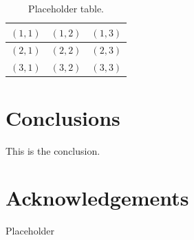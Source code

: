 \documentclass[12pt,a4paper,openright,twoside]{report}
\begin{document}
  \begin{table}[h]                        
    \begin{center}                          
      \begin{tabular}{r|c|c}                  
        \hline \hline                           
        $(1,1)$ & $(1,2)$ & $(1,3)$\\           
        \hline                                  
        $(2,1)$ & $(2,2)$ & $(2,3)$\\           
        \hline                                  
        $(3,1)$ & $(3,2)$ & $(3,3)$\\
        \hline \hline                           
      \end{tabular}
      \caption[Placeholder Table]{Placeholder table.}\label{tab:uno}
    \end{center}
  \end{table}









\chapter*{Conclusions}




This is the conclusion.















\chapter*{Acknowledgements}

\thispagestyle{empty}

  Placeholder 
\end{document}
